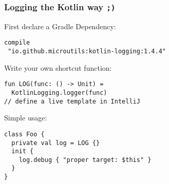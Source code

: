 





\begin{frame}[fragile] \frametitle{Logging the Kotlin way \texttt{;)}}

First declare a Gradle Dependency:
\begin{lstlisting}
compile
 "io.github.microutils:kotlin-logging:1.4.4"
\end{lstlisting}
\pause

Write your own shortcut function:
\begin{lstlisting}
fun LOG(func: () -> Unit) =
  KotlinLogging.logger(func)
// define a live template in IntelliJ
\end{lstlisting}
\pause

Simple usage:
\begin{lstlisting}
class Foo {
  private val log = LOG {}
  init {
    log.debug { "proper target: $this" }
  }
}
\end{lstlisting}
\pause

\end{frame}
